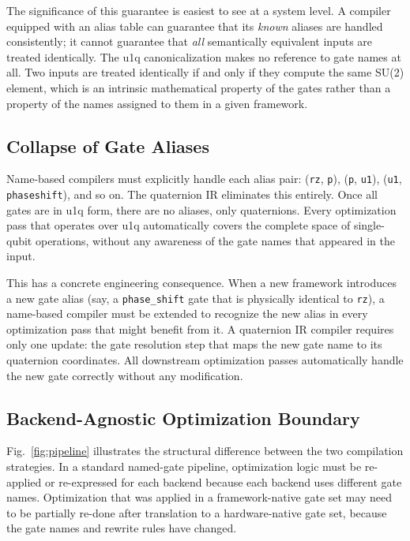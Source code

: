 \documentclass[conference]{IEEEtran}
\begin{document}
The significance of this guarantee is easiest to see at a system level. A compiler
equipped with an alias table can guarantee that its \textit{known} aliases are handled
consistently; it cannot guarantee that \textit{all} semantically equivalent inputs are
treated identically. The u1q canonicalization makes no reference to gate names at all.
Two inputs are treated identically if and only if they compute the same SU(2) element,
which is an intrinsic mathematical property of the gates rather than a property of
the names assigned to them in a given framework.

\subsection{Collapse of Gate Aliases}

Name-based compilers must explicitly handle each alias pair: (\texttt{rz}, \texttt{p}),
(\texttt{p}, \texttt{u1}), (\texttt{u1}, \texttt{phaseshift}), and so on. The quaternion
IR eliminates this entirely. Once all gates are in u1q form, there are no aliases,
only quaternions. Every optimization pass that operates over u1q automatically covers the
complete space of single-qubit operations, without any awareness of the gate names that
appeared in the input.

This has a concrete engineering consequence. When a new framework introduces a new gate
alias (say, a \texttt{phase\_shift} gate that is physically identical to \texttt{rz}),
a name-based compiler must be extended to recognize the new alias in every optimization
pass that might benefit from it. A quaternion IR compiler requires only one update: the
gate resolution step that maps the new gate name to its quaternion coordinates. All
downstream optimization passes automatically handle the new gate correctly without any
modification.

\subsection{Backend-Agnostic Optimization Boundary}

Fig.~\ref{fig:pipeline} illustrates the structural difference between the two compilation
strategies. In a standard named-gate pipeline, optimization logic must be re-applied or
re-expressed for each backend because each backend uses different gate names. Optimization
that was applied in a framework-native gate set may need to be partially re-done after
translation to a hardware-native gate set, because the gate names and rewrite rules have
changed.
\end{document}
